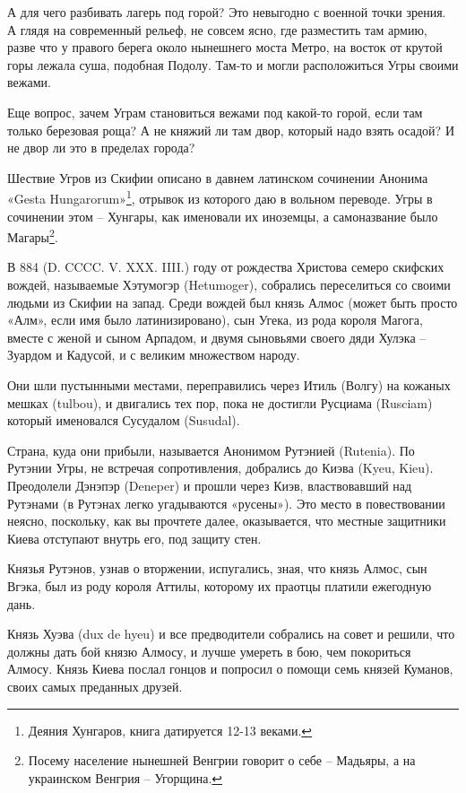 \documentclass[a5paper,11pt,openany]{article}
\begin{document}
А для чего разбивать лагерь под горой? Это невыгодно с военной точки зрения. А глядя на современный рельеф, не совсем ясно, где разместить там армию, разве что у правого берега около нынешнего моста Метро, на восток от крутой горы лежала суша, подобная Подолу. Там-то и могли расположиться Угры своими вежами.

Еще вопрос, зачем Уграм становиться вежами под какой-то горой, если там только березовая роща? А не княжий ли там двор, который надо взять осадой? И не двор ли это в пределах города?

Шествие Угров из Скифии описано в давнем латинском сочинении Анонима «Gesta Hungarorum»\footnote{Деяния Хунгаров, книга датируется 12-13 веками.}, отрывок из которого даю в вольном переводе. Угры в сочинении этом – Хунгары, как именовали их иноземцы, а самоназвание было Магары\footnote{Посему население нынешней Венгрии говорит о себе – Мадьяры, а на украинском Венгрия – Угорщина.}.

В 884 (D. CCCC. V. XXX. IIII.) году от рождества Христова семеро скифских вождей, называемые Хэтумогэр (Hetumoger), собрались переселиться со своими людьми из Скифии на запад. Среди вождей был князь Алмос (может быть просто «Алм», если имя было латинизировано), сын Угека, из рода короля Магога, вместе с женой и сыном Арпадом, и двумя сыновьями своего дяди Хулэка – Зуардом и Кадусой, и с великим множеством народу.

Они шли пустынными местами, переправились через Итиль (Волгу) на кожаных мешках (tulbou), и двигались тех пор, пока не достигли Русциама (Rusciam) который именовался Сусудалом (Susudal).

Страна, куда они прибыли, называется Анонимом Рутэнией (Rutenia). По Рутэнии Угры, не встречая сопротивления, добрались до Киэва (Kyeu, Kieu). Преодолели Дэнэпэр (Deneper) и прошли через Киэв, властвовавший над Рутэнами (в Рутэнах легко угадываются «русены»). Это место в повествовании неясно, поскольку, как вы прочтете далее, оказывается, что местные защитники Киева отступают внутрь его, под защиту стен.

Князья Рутэнов, узнав о вторжении, испугались, зная, что князь Алмос, сын Вгэка, был из роду короля Аттилы, которому их праотцы платили ежегодную дань.

Князь Хуэва (dux de hyeu) и все предводители собрались на совет и решили, что должны дать бой князю Алмосу, и лучше умереть в бою, чем покориться Алмосу. Князь Киева послал гонцов и попросил о помощи семь князей Куманов, своих самых преданных друзей.
\end{document}
